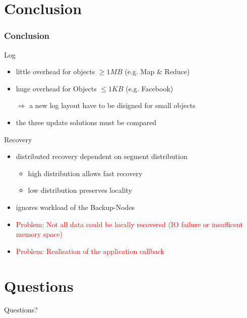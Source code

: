 \documentclass{beamer}
\begin{document}
\section{Conclusion}

		\begin{frame}
			\frametitle{Conclusion}

			\begin{block}{Log}
				\begin{itemize}
					\item little overhead for objects $\ge 1 MB$ (e.g. Map \& Reduce)
					\item huge overhead for Objects $\le 1 KB$ (e.g. Facebook)
					\item[$\Rightarrow$] a new log layout have to be disigned for small objects
					\item the three update solutions must be compared
				\end{itemize}
			\end{block}

			\begin{block}{Recovery}
				\begin{itemize}
					\item distributed recovery dependent on segment distribution
						\begin{itemize}
							\item high distribution allows fast recovery
							\item low distribution preserves locality
						\end{itemize}
					\item ignores workload of the Backup-Nodes
					\item \textcolor{red}{Problem: Not all data could be locally recovered (IO failure or insufficent memory space)}
					\item \textcolor{red}{Problem: Realisation of the application callback}
				\end{itemize}
			\end{block}
		\end{frame}

\section*{Questions}

		\begin{frame}
			\begin{block}{}
				\center\Large{Questions?}
			\end{block}
		\end{frame}
\end{document}
